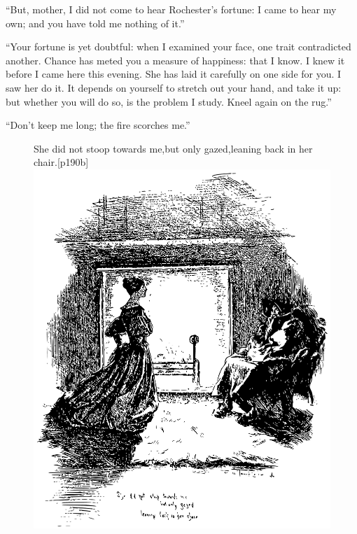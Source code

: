 \enquote{But, mother, I did not come to hear \Mr{} Rochester's fortune: I
came to hear my own; and you have told me nothing of it.}

\enquote{Your fortune is yet doubtful: when I examined your face, one
trait contradicted another. Chance has meted you a measure of
happiness: that I know. I knew it before I came here this evening. She
has laid it carefully on one side for you. I saw her do it. It depends
on yourself to stretch out your hand, and take it up: but whether you
will do so, is the problem I study. Kneel again on the rug.}

\enquote{Don't keep me long; the fire scorches me.}

\begin{figure}
	\begin{sidecaption}{She did not stoop towards me,\linebreak but only gazed,\linebreak leaning back in her chair.}[p190b]
		\centering
		\includegraphics[width=\linewidth]{images/p190b.pdf}
	\end{sidecaption}
\end{figure}


